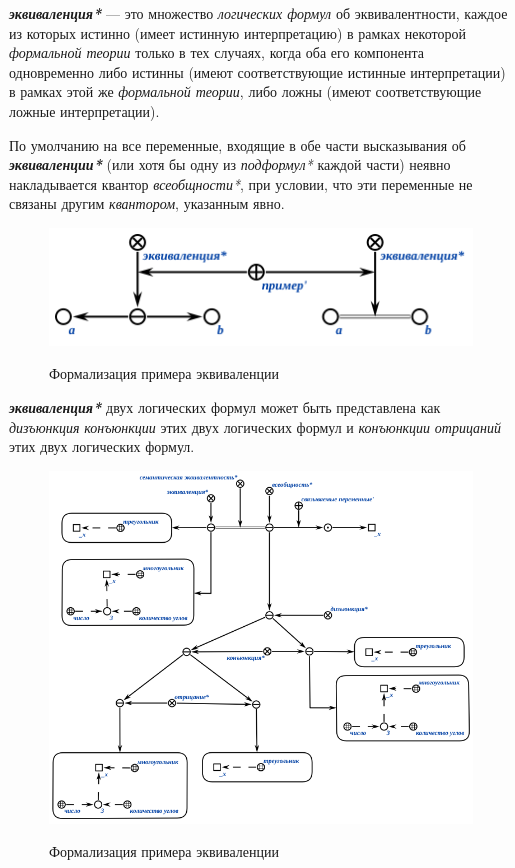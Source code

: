 \textbf{\textit{эквиваленция*}} --- это множество \textit{логических формул} об эквивалентности, каждое из которых истинно (имеет истинную интерпретацию) в рамках некоторой \textit{формальной теории} только в тех случаях, когда оба его компонента одновременно либо истинны (имеют соответствующие истинные интерпретации) в рамках этой же \textit{формальной теории}, либо ложны (имеют соответствующие ложные интерпретации).

По умолчанию на все переменные, входящие в обе части высказывания об \textbf{\textit{эквиваленции*}} (или хотя бы одну из \textit{подформул*} каждой части) неявно накладывается квантор \textit{всеобщности*}, при условии, что эти переменные не связаны другим \textit{квантором}, указанным явно.

\begin{figure}[H]
	\caption{Формализация примера эквиваленции}
	\includegraphics[scale=0.8]{author/part2/figures/logic/equivalent.png}
	\label{fig:equivalent}
\end{figure}

\textbf{\textit{эквиваленция*}} двух логических формул может быть представлена как \textit{дизъюнкция} \textit{конъюнкции} этих двух логических формул и \textit{конъюнкции} \textit{отрицаний} этих двух логических формул.

\begin{figure}[H]
	\caption{Формализация примера эквиваленции}
	\includegraphics[scale=0.8]{author/part2/figures/logic/equivalence_representation.png}
	\label{fig:equivalence_representation}
\end{figure}

